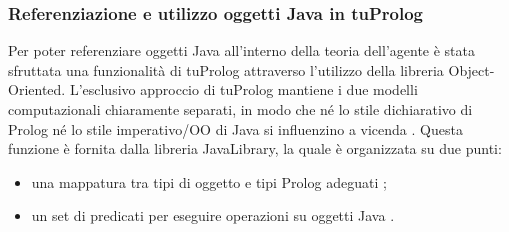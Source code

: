 \subsubsection{Referenziazione e utilizzo oggetti Java in tuProlog}
Per poter referenziare oggetti Java all'interno della teoria dell'agente è stata sfruttata una funzionalità di tuProlog attraverso l'utilizzo della libreria Object-Oriented.
L'esclusivo approccio di tuProlog mantiene i due modelli computazionali chiaramente separati, in modo che né lo stile dichiarativo di Prolog né lo stile imperativo/OO di Java si influenzino a vicenda \cite{2p-alpnews2013}.
Questa funzione è fornita dalla libreria JavaLibrary, la quale è organizzata su due punti:
\begin{itemize}
   \item una mappatura tra tipi di oggetto e tipi Prolog adeguati \cite{2p-alpnews2013};
   \item un set di predicati per eseguire operazioni su oggetti Java \cite{2p-alpnews2013}.
\end{itemize}

